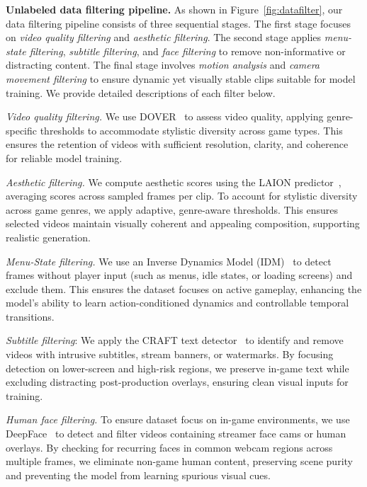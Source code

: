 \documentclass{article}
\begin{document}
\textbf{Unlabeled data filtering pipeline.}
As shown in Figure~\ref{fig:datafilter}, our data filtering pipeline consists of three sequential stages. The first stage focuses on \textit{video quality filtering} and \textit{aesthetic filtering}. The second stage applies \textit{menu-state filtering}, \textit{subtitle filtering}, and \textit{face filtering} to remove non-informative or distracting content. The final stage involves \textit{motion analysis} and \textit{camera movement filtering} to ensure dynamic yet visually stable clips suitable for model training. We provide detailed descriptions of each filter below.

 


\textit{Video quality filtering.}
We use DOVER~\cite{wu2023dover} to assess video quality, applying genre-specific thresholds to accommodate stylistic diversity across game types. This ensures the retention of videos with sufficient resolution, clarity, and coherence for reliable model training.
 


\textit{Aesthetic filtering.}
We compute aesthetic scores using the LAION predictor~\cite{LAIONaes}, averaging scores across sampled frames per clip. To account for stylistic diversity across game genres, we apply adaptive, genre-aware thresholds. This ensures selected videos maintain visually coherent and appealing composition, supporting realistic generation.

\textit{Menu-State filtering.}
We use an Inverse Dynamics Model (IDM)~\cite{baker2022video} to detect frames without player input (such as menus, idle states, or loading screens) and exclude them. This ensures the dataset focuses on active gameplay, enhancing the model's ability to learn action-conditioned dynamics and controllable temporal transitions.



\textit{Subtitle filtering}: We apply the CRAFT text detector~\cite{baek2019character} to identify and remove videos with intrusive subtitles, stream banners, or watermarks. By focusing detection on lower-screen and high-risk regions, we preserve in-game text while excluding distracting post-production overlays, ensuring clean visual inputs for training.

\textit{Human face filtering.}
To ensure dataset focus on in-game environments, we use DeepFace~\cite{serengil2024lightface} to detect and filter videos containing streamer face cams or human overlays. By checking for recurring faces in common webcam regions across multiple frames, we eliminate non-game human content, preserving scene purity and preventing the model from learning spurious visual cues.
\end{document}

